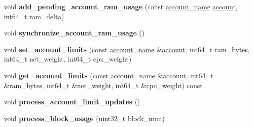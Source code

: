 \begin{DoxyCompactItemize}
\item 
\mbox{\label{classaacio_1_1chain_1_1resource__limits_1_1resource__limits__manager_a783aa1b0c296c6856c0b157edcf9e18f}} 
void {\bfseries add\+\_\+pending\+\_\+account\+\_\+ram\+\_\+usage} (const \mbox{\hyperlink{structaacio_1_1chain_1_1name}{account\+\_\+name}} \mbox{\hyperlink{structaccount}{account}}, int64\+\_\+t ram\+\_\+delta)
\item 
\mbox{\label{classaacio_1_1chain_1_1resource__limits_1_1resource__limits__manager_a0294be974c19a2b651f400961099bb5d}} 
void {\bfseries synchronize\+\_\+account\+\_\+ram\+\_\+usage} ()
\item 
\mbox{\label{classaacio_1_1chain_1_1resource__limits_1_1resource__limits__manager_accbd6b1337a7624ef817e62e403b7814}} 
void {\bfseries set\+\_\+account\+\_\+limits} (const \mbox{\hyperlink{structaacio_1_1chain_1_1name}{account\+\_\+name}} \&\mbox{\hyperlink{structaccount}{account}}, int64\+\_\+t ram\+\_\+bytes, int64\+\_\+t net\+\_\+weight, int64\+\_\+t cpu\+\_\+weight)
\item 
\mbox{\label{classaacio_1_1chain_1_1resource__limits_1_1resource__limits__manager_ae35c43d049d5f08b2ff00f064c27f3bc}} 
void {\bfseries get\+\_\+account\+\_\+limits} (const \mbox{\hyperlink{structaacio_1_1chain_1_1name}{account\+\_\+name}} \&\mbox{\hyperlink{structaccount}{account}}, int64\+\_\+t \&ram\+\_\+bytes, int64\+\_\+t \&net\+\_\+weight, int64\+\_\+t \&cpu\+\_\+weight) const
\item 
\mbox{\label{classaacio_1_1chain_1_1resource__limits_1_1resource__limits__manager_af731825ac008a3d39b110c545ef19185}} 
void {\bfseries process\+\_\+account\+\_\+limit\+\_\+updates} ()
\item 
\mbox{\label{classaacio_1_1chain_1_1resource__limits_1_1resource__limits__manager_a109d4dd3c841a9daf08cb1b8ab1d5a1f}} 
void {\bfseries process\+\_\+block\+\_\+usage} (uint32\+\_\+t block\+\_\+num)

\end{DoxyCompactItemize}
